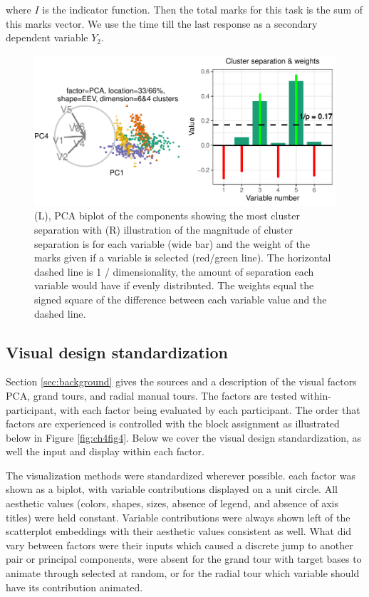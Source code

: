 \documentclass{template/monashthesis}
\begin{document}
where \(I\) is the indicator function. Then the total marks for this task is the sum of this marks vector. We use the time till the last response as a secondary dependent variable \(Y_2\).

\begin{figure}

{\centering \includegraphics[width=1\linewidth,]{./figures_from_script/ch4_fig3_accuracy_measure} 

}

\caption{(L), PCA biplot of the components showing the most cluster separation with (R) illustration of the magnitude of cluster separation is for each variable (wide bar) and the weight of the marks given if a variable is selected (red/green line). The horizontal dashed line is 1 / dimensionality, the amount of separation each variable would have if evenly distributed. The weights equal the signed square of the difference between each variable value and the dashed line.}\label{fig:ch4fig3}
\end{figure}

\hypertarget{sec:standardization}{%
\subsection{Visual design standardization}\label{sec:standardization}}

Section \ref{sec:background} gives the sources and a description of the visual factors PCA, grand tours, and radial manual tours. The factors are tested within-participant, with each factor being evaluated by each participant. The order that factors are experienced is controlled with the block assignment as illustrated below in Figure \ref{fig:ch4fig4}. Below we cover the visual design standardization, as well the input and display within each factor.

The visualization methods were standardized wherever possible. each factor was shown as a biplot, with variable contributions displayed on a unit circle. All aesthetic values (colors, shapes, sizes, absence of legend, and absence of axis titles) were held constant. Variable contributions were always shown left of the scatterplot embeddings with their aesthetic values consistent as well. What did vary between factors were their inputs which caused a discrete jump to another pair or principal components, were absent for the grand tour with target bases to animate through selected at random, or for the radial tour which variable should have its contribution animated.
\end{document}
